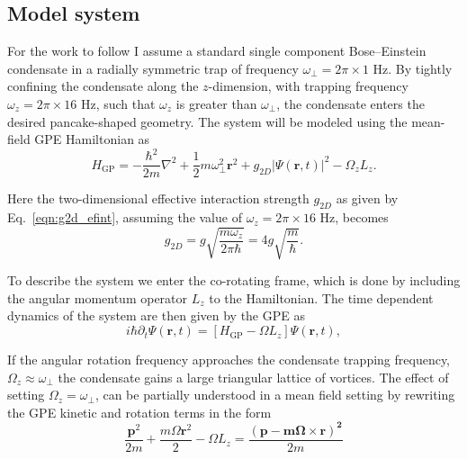 \subsection{Model system}\label{sec:modelsystem}
For the work to follow I assume a standard single component Bose--Einstein condensate in a radially symmetric trap of frequency $\omega_\perp = 2\pi \times 1$ Hz. By tightly confining the condensate along the $z$-dimension, with trapping frequency $\omega_z = 2\pi\times 16$ Hz, such that $\omega_z $ is greater than $ \omega_\perp$, the condensate enters the desired pancake-shaped geometry. The system will be modeled using the mean-field GPE Hamiltonian as
\begin{equation}\label{eqn:gpe_h0}
	H_{\mathrm{GP}} = -\frac{\hbar^2}{2m}\nabla^2 + \frac{1}{2}m\omega_{\perp}^2\mathbf{r}^2 + g_{2D}\vert\Psi(\mathbf{r},t)\vert^2 - \Omega_z L_z.
\end{equation}

Here the two-dimensional effective interaction strength $g_{2D}$ as given by Eq.~\eqref{eqn:g2d_efint}, assuming the value of $\omega_z=2\pi\times 16$ Hz, becomes
\begin{equation}
g_{2D} = g\sqrt{\frac{m\omega_z}{2\pi\hbar}} = 4g \sqrt{\frac{m}{\hbar}}.
\end{equation}

To describe the system we enter the co-rotating frame, which is done by including the angular momentum operator $L_z$ to the Hamiltonian. The time dependent dynamics of the system are then given by the GPE as
\begin{equation}\label{eqn:gpe2d_}
	i\hbar\partial_t\Psi(\mathbf{r},t) = \left[ H_{\text{GP}}  -  \Omega L_z \right] \Psi(\mathbf{r},t),
\end{equation}

If the angular rotation frequency approaches the condensate trapping frequency, $\Omega_z \approx \omega_\perp$ the condensate gains a large triangular lattice of vortices.  The effect of setting $\Omega_z=\omega_\perp$, can be partially understood in a mean field setting by rewriting the GPE kinetic and rotation terms in the form
\begin{equation}
    \frac{\mathbf{p}^2}{2m} + \frac{m\Omega\mathbf{r}^2}{2} - \Omega L_z = \frac{\mathbf{\left(p -m\boldsymbol{\Omega}\times\mathbf{r}\right)^2}}{2m}
\end{equation}


